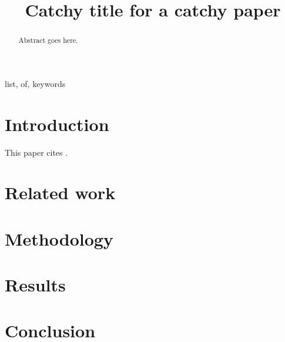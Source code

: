 \documentclass[conference]{IEEEtran}
\begin{document}
\title{Catchy title for a catchy paper}


\author{
}

\maketitle

\begin{abstract}
    Abstract goes here. 
\end{abstract}

\begin{IEEEkeywords}
list, of, keywords
\end{IEEEkeywords}


\section{Introduction}
\label{sec:intro}

This paper cites \citet{johndoe}.

\section{Related work}
\label{sec:related}

\section{Methodology}
\label{sec:methodology}

\section{Results}
\label{sec:results}



\section{Conclusion}
\label{sec:conclusion}

\printbibliography

\end{document}
